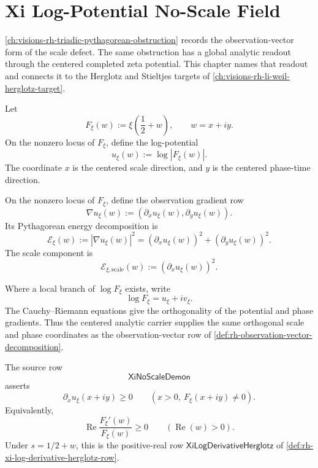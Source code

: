 \chapter{Xi Log-Potential No-Scale Field}
\label{ch:visions-rh-xi-log-potential-no-scale}

\autoref{ch:visions-rh-triadic-pythagorean-obstruction} records the
observation-vector form of the scale defect.  The same obstruction has a
global analytic readout through the centered completed zeta potential.
This chapter names that readout and connects it to the Herglotz and
Stieltjes targets of
\autoref{ch:visions-rh-li-weil-herglotz-target}.

\begin{definition}
\label{def:rh-centered-xi-log-potential}
Let
$$
F_\xi(w):=\xi\left(\frac12+w\right),
\qquad
w=x+iy.
$$
On the nonzero locus of $F_\xi$, define the log-potential
$$
u_\xi(w):=\log|F_\xi(w)|.
$$
The coordinate $x$ is the centered scale direction, and $y$ is the
centered phase-time direction.
\end{definition}

\begin{definition}
\label{def:rh-xi-log-potential-gradient-energy}
On the nonzero locus of $F_\xi$, define the observation gradient row
$$
\nabla u_\xi(w)
:=
(\partial_xu_\xi(w),\partial_yu_\xi(w)).
$$
Its Pythagorean energy decomposition is
$$
\mathcal E_\xi(w)
:=
|\nabla u_\xi(w)|^2
=
(\partial_xu_\xi(w))^2+(\partial_yu_\xi(w))^2.
$$
The scale component is
$$
\mathcal E_{\xi,\mathrm{scale}}(w)
:=
(\partial_xu_\xi(w))^2.
$$
\end{definition}

\begin{principle}
\label{prin:rh-holomorphic-coordinates-orthogonal}
Where a local branch of $\log F_\xi$ exists, write
$$
\log F_\xi=u_\xi+iv_\xi.
$$
The Cauchy--Riemann equations give the orthogonality of the potential and
phase gradients.  Thus the centered analytic carrier supplies the same
orthogonal scale and phase coordinates as the observation-vector row of
\autoref{def:rh-observation-vector-decomposition}.
\end{principle}

\begin{definition}
\label{def:rh-xi-no-scale-demon-row}
The source row
$$
\mathsf{XiNoScaleDemon}
$$
asserts
$$
\partial_xu_\xi(x+iy)\ge0
\qquad
(x>0,\ F_\xi(x+iy)\ne0).
$$
Equivalently,
$$
\operatorname{Re}
\frac{F_\xi'(w)}{F_\xi(w)}
\ge0
\qquad
(\operatorname{Re}(w)>0).
$$
Under $s=1/2+w$, this is the positive-real row
$\mathsf{XiLogDerivativeHerglotz}$ of
\autoref{def:rh-xi-log-derivative-herglotz-row}.
\end{definition}

